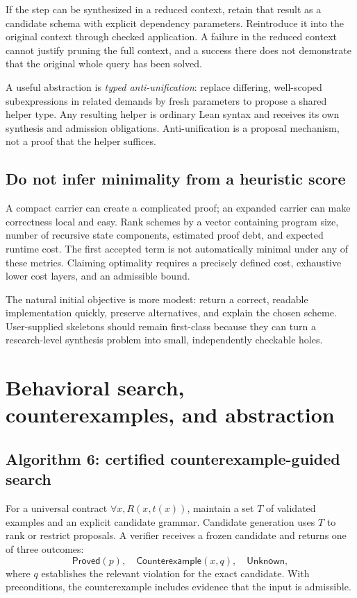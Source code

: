 \documentclass[11pt,letterpaper]{article}
\theoremstyle{definition}\newtheorem{definition}[theorem]{Definition}
\theoremstyle{remark}\newtheorem{remark}[theorem]{Remark}
\begin{document}
If the step can be synthesized in a reduced context, retain that result as a
candidate schema with explicit dependency parameters. Reintroduce it into the
original context through checked application. A failure in the reduced context
cannot justify pruning the full context, and a success there does not demonstrate
that the original whole query has been solved.

A useful abstraction is \emph{typed anti-unification}: replace differing,
well-scoped subexpressions in related demands by fresh parameters to propose a
shared helper type. Any resulting helper is ordinary Lean syntax and receives
its own synthesis and admission obligations. Anti-unification is a proposal
mechanism, not a proof that the helper suffices.

\subsection{Do not infer minimality from a heuristic score}

A compact carrier can create a complicated proof; an expanded carrier can make
correctness local and easy. Rank schemes by a vector containing program size,
number of recursive state components, estimated proof debt, and expected runtime
cost. The first accepted term is not automatically minimal under any of these
metrics. Claiming optimality requires a precisely defined cost, exhaustive lower
cost layers, and an admissible bound.

The natural initial objective is more modest: return a correct, readable
implementation quickly, preserve alternatives, and explain the chosen scheme.
User-supplied skeletons should remain first-class because they can turn a
research-level synthesis problem into small, independently checkable holes.

\section{Behavioral search, counterexamples, and abstraction}
\label{sec:behavior}

\subsection{Algorithm 6: certified counterexample-guided search}

For a universal contract $\forall x, R(x,t(x))$, maintain a set $T$ of validated
examples and an explicit candidate grammar. Candidate generation uses $T$ to
rank or restrict proposals. A verifier receives a frozen candidate and returns
one of three outcomes:
\[
 \mathsf{Proved}(p),\quad
 \mathsf{Counterexample}(x,q),\quad
 \mathsf{Unknown},
\]
where $q$ establishes the relevant violation for the exact candidate. With
preconditions, the counterexample includes evidence that the input is admissible.
\end{document}
